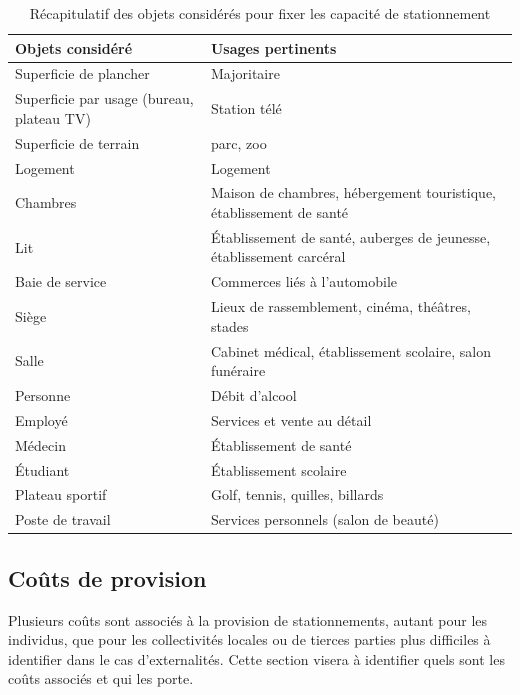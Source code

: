   \begin{table}[h]
    \centering
    \begin{tabular}{p{4cm} p{8cm}}
      \hline
      Objets considéré & Usages pertinents \\
      \hline
      Superficie de plancher & Majoritaire\\
      Superficie par usage (bureau, plateau TV) & Station télé \\
      Superficie de terrain & parc, zoo \\
      Logement & Logement \\
      Chambres & Maison de chambres, hébergement touristique, établissement de santé\\
      Lit & Établissement de santé, auberges de jeunesse, établissement carcéral \\
      Baie de service & Commerces liés à l'automobile\\
      Siège & Lieux de rassemblement, cinéma, théâtres, stades \\
      Salle & Cabinet médical, établissement scolaire, salon funéraire\\
      Personne & Débit d'alcool\\
      Employé & Services et vente au détail\\
      Médecin & Établissement de santé\\
      Étudiant & Établissement scolaire\\
      Plateau sportif & Golf, tennis, quilles, billards\\
      Poste de travail & Services personnels (salon de beauté)\\
      \hline
    \end{tabular}
    \caption{Récapitulatif des objets considérés pour fixer les capacité de stationnement}\label{tab:objet_pour_inference_capacite}
  \end{table}
  

  \FloatBarrier
  \subsection{Coûts de provision}
    Plusieurs coûts sont associés à la provision de stationnements, autant pour les individus, que pour les collectivités locales ou de tierces parties plus difficiles à identifier dans le cas d'externalités. Cette section visera à identifier quels sont les coûts associés et qui les porte.

